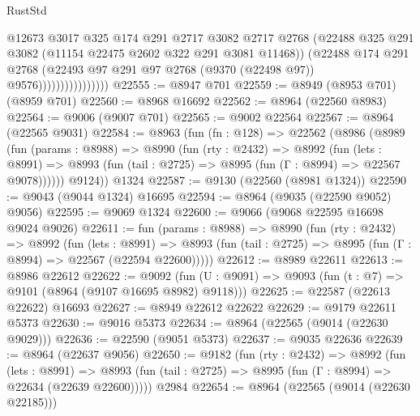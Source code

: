 \begin{lexlean}{RustStd}
\begin{coremodule}
                                @12673
                                @3017
                                @325
                                @174
                                @291
                                @2717
                                @3082
                                @2717
                                @2768
                                (@22488
                                  @325
                                  @291
                                  @3082
                                  (@11154 @22475 @2602 @322 @291 @3081 @11468))
                                (@22488
                                  @174
                                  @291
                                  @2768
                                  (@22493
                                    @97
                                    @291
                                    @97
                                    @2768
                                    (@9370 (@22498 @97))
                                    @9576))))))))))))))))
@22555 := @8947 @701
@22559 := @8949 (@8953 @701) (@8959 @701)
@22560 := @8968 @16692
@22562 := @8964 (@22560 @8983)
@22564 := @9006 (@9007 @701)
@22565 := @9002 @22564
@22567 := @8964 (@22565 @9031)
@22584 := @8963
    (fun (fn : @128) =>
    @22562
      (@8986
        (@8989
          (fun (params : @8988) =>
          @8990
            (fun (rty : @2432) =>
            @8992
              (fun (lets : @8991) =>
              @8993 (fun (tail : @2725) => @8995 (fun (Γ : @8994) => @22567 @9078))))))
        @9124))
    @1324
@22587 := @9130 (@22560 (@8981 @1324))
@22590 := @9043 (@9044 @1324) @16695
@22594 := @8964 (@9035 (@22590 @9052) @9056)
@22595 := @9069 @1324
@22600 := @9066 (@9068 @22595 @16698 @9024 @9026)
@22611 := fun (params : @8988) =>
  @8990
    (fun (rty : @2432) =>
    @8992
      (fun (lets : @8991) =>
      @8993 (fun (tail : @2725) => @8995 (fun (Γ : @8994) => @22567 (@22594 @22600)))))
@22612 := @8989 @22611
@22613 := @8986 @22612
@22622 := @9092
    (fun (U : @9091) => @9093 (fun (t : @7) => @9101 (@8964 (@9107 @16695 @8982) @9118)))
@22625 := @22587 (@22613 @22622) @16693
@22627 := @8949 @22612 @22622
@22629 := @9179 @22611 @5373
@22630 := @9016 @5373
@22634 := @8964 (@22565 (@9014 (@22630 @9029)))
@22636 := @22590 (@9051 @5373)
@22637 := @9035 @22636
@22639 := @8964 (@22637 @9056)
@22650 := @9182
    (fun (rty : @2432) =>
    @8992
      (fun (lets : @8991) =>
      @8993 (fun (tail : @2725) => @8995 (fun (Γ : @8994) => @22634 (@22639 @22600)))))
    @2984
@22654 := @8964 (@22565 (@9014 (@22630 @22185)))

\end{coremodule}
\end{lexlean}
